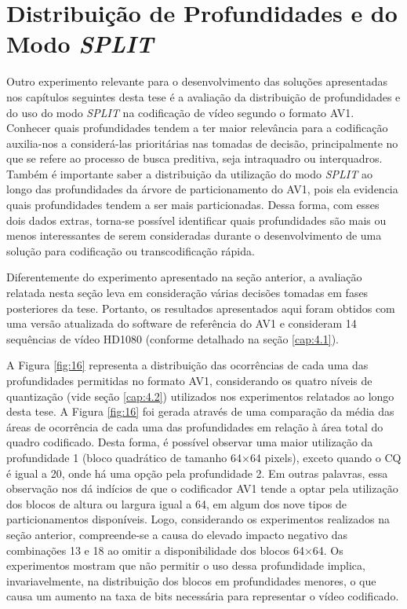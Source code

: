 \section{Distribuição de Profundidades e do Modo \textit{SPLIT}}
\label{cap:5.2}

Outro experimento relevante para o desenvolvimento das soluções apresentadas nos capítulos seguintes desta tese é a avaliação da distribuição de profundidades e do uso do modo \textit{SPLIT} na codificação de vídeo segundo o formato AV1. Conhecer quais profundidades tendem a ter maior relevância para a codificação auxilia-nos a considerá-las prioritárias nas tomadas de decisão, principalmente no que se refere ao processo de busca preditiva, seja intraquadro ou interquadros. Também é importante saber a distribuição da utilização do modo \textit{SPLIT} ao longo das profundidades da árvore de particionamento do AV1, pois ela evidencia quais profundidades tendem a ser mais particionadas. Dessa forma, com esses dois dados extras, torna-se possível identificar quais profundidades são mais ou menos interessantes de serem consideradas durante o desenvolvimento de uma solução para codificação ou transcodificação rápida.

Diferentemente do experimento apresentado na seção anterior, a avaliação relatada nesta seção leva em consideração várias decisões tomadas em fases posteriores da tese. Portanto, os resultados apresentados aqui foram obtidos com uma versão atualizada do software de referência do AV1 e consideram 14 sequências de vídeo HD1080 (conforme detalhado na seção \ref{cap:4.1}).

A Figura \ref{fig:16} representa a distribuição das ocorrências de cada uma das profundidades permitidas no formato AV1, considerando os quatro níveis de quantização (vide seção \ref{cap:4.2}) utilizados nos experimentos relatados ao longo desta tese. A Figura \ref{fig:16} foi gerada através de uma comparação da média das áreas de ocorrência de cada uma das profundidades em relação à área total do quadro codificado. Desta forma, é possível observar uma maior utilização da profundidade 1 (bloco quadrático de tamanho 64$\times$64 pixels), exceto quando o CQ é igual a 20, onde há uma opção pela profundidade 2. Em outras palavras, essa observação nos dá indícios de que o codificador AV1 tende a optar pela utilização dos blocos de altura ou largura igual a 64, em algum dos nove tipos de particionamentos disponíveis. Logo, considerando os experimentos realizados na seção anterior, compreende-se a causa do elevado impacto negativo das combinações 13 e 18 ao omitir a disponibilidade dos blocos 64$\times$64. Os experimentos mostram que não permitir o uso dessa profundidade implica, invariavelmente, na distribuição dos blocos em profundidades menores, o que causa um aumento na taxa de bits necessária para representar o vídeo codificado.

